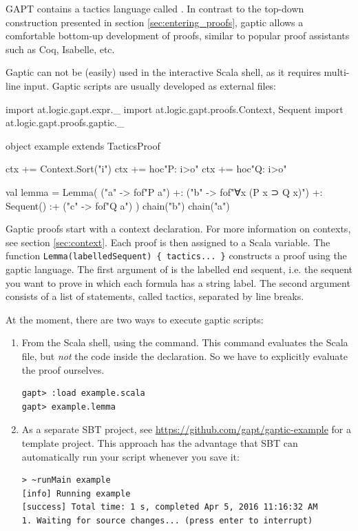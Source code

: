 \documentclass[a4paper,11pt]{article}
\newcommand{\cli}[1]{{\ttfamily {#1}}}
\begin{document}
GAPT contains a tactics language called \cli{gaptic}.  In contrast to the
top-down construction presented in section \ref{sec:entering_proofs},
gaptic allows a comfortable bottom-up development of proofs, similar
to popular proof assistants such as Coq, Isabelle, etc.

Gaptic can not be (easily) used in the interactive Scala shell, as it requires
multi-line input.  Gaptic scripts are usually developed as external files:
\begin{tacticslisting}
import at.logic.gapt.expr._
import at.logic.gapt.proofs.{Context, Sequent}
import at.logic.gapt.proofs.gaptic._

object example extends TacticsProof {
  ctx += Context.Sort("i")
  ctx += hoc"P: i>o"
  ctx += hoc"Q: i>o"

  val lemma = Lemma(
    ("a" -> fof"P a") +:
    ("b" -> fof"∀x (P x ⊃ Q x)") +:
    Sequent()
    :+ ("c" -> fof"Q a")
  ) {
    chain("b")
    chain("a")
  }
}
\end{tacticslisting}
\begin{tacticsoutput}
\end{tacticsoutput}

Gaptic proofs start with a context declaration. For more information on
contexts, see section \ref{sec:context}.
Each proof is then assigned to a Scala variable.  The function
\verb,Lemma(labelledSequent) { tactics... }, constructs a proof using the
gaptic language.  The first argument of \cli{Lemma} is the labelled end
sequent, i.e. the sequent you want to prove in which each formula has a string
label.  The second argument consists of a list of statements, called tactics,
separated by line breaks.

At the moment, there are two ways to execute gaptic scripts:
\begin{enumerate}

  \item From the Scala shell, using the \cli{:load} command.  This command
    evaluates the Scala file, but \emph{not} the code inside the \cli{object}
    declaration.  So we have to explicitly evaluate the proof ourselves.
\begin{lstlisting}
gapt> :load example.scala
gapt> example.lemma
\end{lstlisting}

  \item As a separate SBT project, see
    \url{https://github.com/gapt/gaptic-example} for a template project.  This
approach has the advantage that SBT can automatically run your script whenever
you save it:
\begin{lstlisting}
> ~runMain example
[info] Running example 
[success] Total time: 1 s, completed Apr 5, 2016 11:16:32 AM
1. Waiting for source changes... (press enter to interrupt)
\end{lstlisting}

\end{enumerate}
\end{document}
